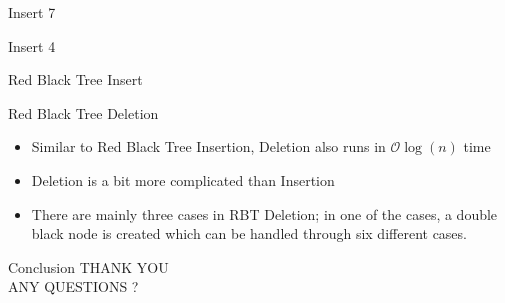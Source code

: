 \documentclass{beamer}
\begin{document}
\begin{frame}{Insert 7}
\centering

\end{frame}

\begin{frame}{Insert 4}
\centering

\end{frame}

\begin{frame}{Red Black Tree Insert}
    
\end{frame}

\begin{frame}{Red Black Tree Deletion}
    \begin{itemize}
        \item<1-> Similar to Red Black Tree Insertion, Deletion also runs in $\mathcal{O}\log(n)$ time
        \item<2-> Deletion is a bit more complicated than Insertion
        \item<3-> There are mainly three cases in RBT Deletion; in one of the cases, a double black node is created which can be handled through six different cases.
       
    \end{itemize}
    
\end{frame}
    \begin{frame}{Conclusion}
    \centering
    \Huge THANK YOU \\
    \Huge ANY QUESTIONS ?
\end{frame}
\end{document}
